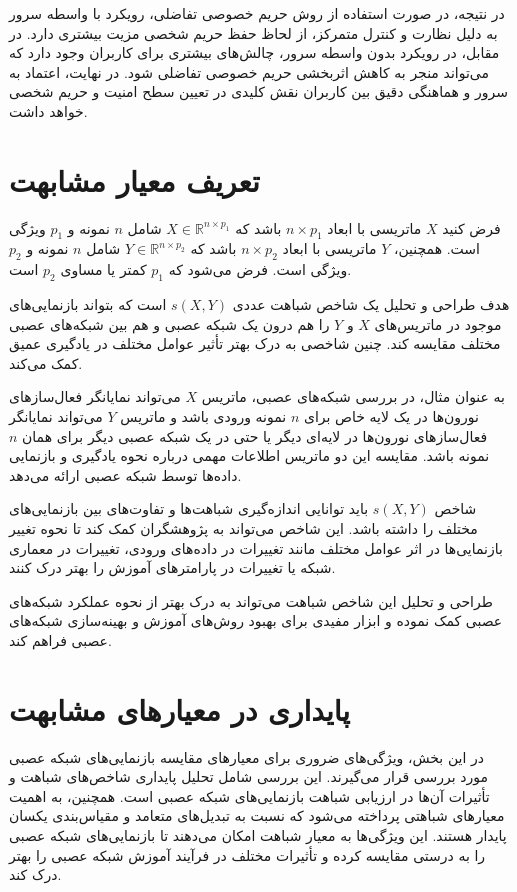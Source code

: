 در نتیجه، در صورت استفاده از روش حریم خصوصی تفاضلی، رویکرد با واسطه سرور به دلیل نظارت و کنترل متمرکز، از لحاظ حفظ حریم شخصی مزیت بیشتری دارد. در مقابل، در رویکرد بدون واسطه سرور، چالش‌های بیشتری برای کاربران وجود دارد که می‌تواند منجر به کاهش اثربخشی حریم خصوصی تفاضلی شود. در نهایت، اعتماد به سرور و هماهنگی دقیق بین کاربران نقش کلیدی در تعیین سطح امنیت و حریم شخصی خواهد داشت.



\section{
	تعریف معیار مشابهت
}
فرض کنید \( X \) ماتریسی با ابعاد \( n \times p_1 \) باشد که \( X \in \mathbb{R}^{n \times p_1} \) شامل \( n \) نمونه و \( p_1 \) ویژگی است. همچنین، \( Y \) ماتریسی با ابعاد \( n \times p_2 \) باشد که \( Y \in \mathbb{R}^{n \times p_2} \) شامل \( n \) نمونه و \( p_2 \) ویژگی است. فرض می‌شود که \( p_1 \) کمتر یا مساوی \( p_2 \) است.


هدف طراحی و تحلیل یک شاخص شباهت عددی \( s(X, Y) \) است که بتواند بازنمایی‌های%
موجود در ماتریس‌های \( X \) و \( Y \) را هم درون یک شبکه عصبی و هم بین شبکه‌های عصبی مختلف مقایسه کند. چنین شاخصی به درک بهتر تأثیر عوامل مختلف در یادگیری عمیق کمک می‌کند.

به عنوان مثال، در بررسی شبکه‌های عصبی، ماتریس \( X \) می‌تواند نمایانگر فعال‌سازهای%
نورون‌ها در یک لایه خاص برای \( n \) نمونه ورودی باشد و ماتریس \( Y \) می‌تواند نمایانگر فعال‌سازهای نورون‌ها در لایه‌ای دیگر یا حتی در یک شبکه عصبی دیگر برای همان \( n \) نمونه باشد. مقایسه این دو ماتریس اطلاعات مهمی درباره نحوه یادگیری و بازنمایی داده‌ها توسط شبکه عصبی ارائه می‌دهد.

شاخص \( s(X, Y) \) باید توانایی اندازه‌گیری شباهت‌ها و تفاوت‌های بین بازنمایی‌های مختلف را داشته باشد. این شاخص می‌تواند به پژوهشگران کمک کند تا نحوه تغییر بازنمایی‌ها در اثر عوامل مختلف مانند تغییرات در داده‌های ورودی، تغییرات در معماری شبکه یا تغییرات در پارامترهای آموزش را بهتر درک کنند.

طراحی و تحلیل این شاخص شباهت می‌تواند به درک بهتر از نحوه عملکرد شبکه‌های عصبی کمک نموده و ابزار مفیدی برای بهبود روش‌های آموزش و بهینه‌سازی شبکه‌های عصبی فراهم کند.


\section{
	پایداری در معیارهای مشابهت
}
در این بخش، ویژگی‌های ضروری برای معیارهای مقایسه بازنمایی‌های شبکه عصبی مورد بررسی قرار می‌گیرند. این بررسی شامل تحلیل پایداری شاخص‌های شباهت و تأثیرات آن‌ها در ارزیابی شباهت بازنمایی‌های شبکه عصبی است. همچنین، به اهمیت معیارهای شباهتی پرداخته می‌شود که نسبت به تبدیل‌های متعامد%
و مقیاس‌بندی یکسان%
پایدار هستند.
این ویژگی‌ها به معیار شباهت امکان می‌دهند تا بازنمایی‌های شبکه عصبی را به درستی مقایسه کرده و تأثیرات مختلف در فرآیند آموزش شبکه عصبی را بهتر درک کند.



